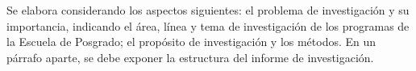 \begin{introduccion}

Se elabora considerando los aspectos siguientes: el problema de investigación y su importancia, indicando el área, línea y tema de investigación de los programas de la Escuela de Posgrado; el propósito de investigación y los métodos. En un párrafo aparte, se debe exponer la estructura del informe de investigación.

\end{introduccion}